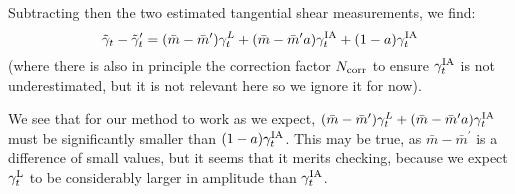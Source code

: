 \documentclass[onecolumn,amsmath,aps,fleqn, superscriptaddress]{revtex4}
\begin{document}
Subtracting then the two estimated tangential shear measurements, we find:
\begin{equation}
\tilde{\gamma}_t - \tilde{\gamma}_t^\prime = (\bar{m} - \bar{m}^\prime) \gamma_t^L + (\bar{m} - \bar{m}^\prime a) \gamma_t^{\rm IA} + (1-a) \gamma_t^{\rm IA}
\label{diff_w_mbars}
\end{equation}
(where there is also in principle the correction factor $N_{\rm corr}$ to ensure $\gamma_t^{\rm IA}$ is not underestimated, but it is not relevant here so we ignore it for now). 

We see that for our method to work as we expect, $(\bar{m} - \bar{m}^\prime) \gamma_t^L + (\bar{m} - \bar{m}^\prime a) \gamma_t^{\rm IA}$ must be significantly smaller than $(1-a) \gamma_t^{\rm IA}$. This may be true, as $\bar{m} - \bar{m}^\prime$ is a difference of small values, but it seems that it merits checking, because we expect $\gamma_t^{\rm L}$ to be considerably larger in amplitude than $\gamma_t^{\rm IA}$.












\end{document}
